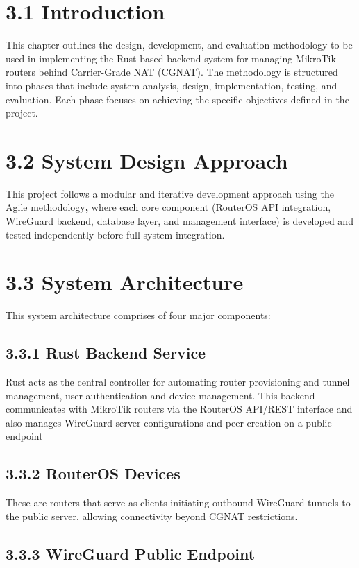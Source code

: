 \documentclass[12pt,a4paper,oneside]{report}
\begin{document}
\section{3.1 Introduction}

This chapter outlines the design, development, and evaluation methodology to be used in implementing the Rust-based backend system for managing MikroTik routers behind Carrier-Grade NAT (CGNAT). The methodology is structured into phases that include system analysis, design, implementation, testing, and evaluation. Each phase focuses on achieving the specific objectives defined in the project.


\section{3.2 System Design Approach}

This project follows a modular and iterative development approach using the Agile methodology\textbf{, }where each core component (RouterOS API integration, WireGuard backend, database layer, and management interface) is developed and tested independently before full system integration.


\section{3.3 System Architecture}

This system architecture comprises of four major components:


\subsection{3.3.1 Rust Backend Service}

Rust acts as the central controller for automating router provisioning and tunnel management, user authentication and device management. This backend communicates with MikroTik routers via the RouterOS API/REST interface and also manages WireGuard server configurations and peer creation on a public endpoint


\subsection{3.3.2 RouterOS Devices}

These are routers that serve as clients initiating outbound WireGuard tunnels to the public server, allowing connectivity beyond CGNAT restrictions.


\subsection{3.3.3 WireGuard Public Endpoint}
\end{document}
